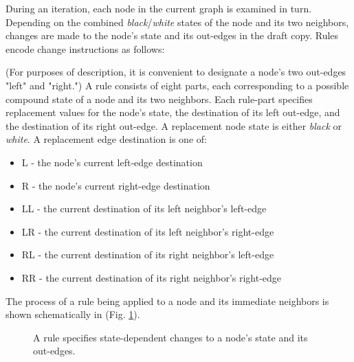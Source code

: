 \documentclass[twoside,twocolumn]{article}
\begin{document}
During an iteration, each node in the current graph is examined in turn.
Depending on the combined \textit{black}/\textit{white}
states of the node and its two neighbors, changes are made to the node's
state and its out-edges in the draft copy. Rules encode change
instructions as follows:

(For purposes of description, it is convenient to designate a node's two out-edges "left" and "right.")
A rule consists of eight parts, each corresponding to a possible compound state of a node and its
two neighbors. Each rule-part specifies replacement values for
the node's state, the destination of its left out-edge, and the destination of its right
out-edge. A replacement node state is either \textit{black} or \textit{white}.
A replacement edge destination is one of:

\begin{itemize}
    \item L - the node's current left-edge destination
    \item R - the node's current right-edge destination
    \item LL - the current destination of its left neighbor's left-edge
    \item LR - the current destination of its left neighbor's right-edge
    \item RL - the current destination of its right neighbor's left-edge
    \item RR - the current destination of its right neighbor's right-edge
\end{itemize}
The process of a rule being applied to a node and its immediate neighbors is shown
schematically in (Fig. \ref{fig:Fig1}).

\begin{figure}[tb] 
    \centering
    \caption{A rule specifies state-dependent changes to a node's state and its out-edges.}
    \label{fig:Fig1}
\end{figure}
\end{document}
